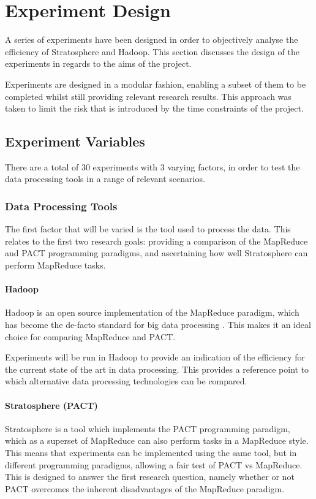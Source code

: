 \chapter{Experiment Design}
A series of experiments have been designed in order to objectively analyse the efficiency of Stratosphere and Hadoop. This section discusses the design of the experiments in regards to the aims of the project.

Experiments are designed in a modular fashion, enabling a subset of them to be completed whilst still providing relevant research results. This approach was taken to limit the risk that is introduced by the time constraints of the project. 

\section{Experiment Variables}
There are a total of 30 experiments with 3 varying factors, in order to test the data processing tools in a range of relevant scenarios. 

\subsection{Data Processing Tools}
The first factor that will be varied is the tool used to process the data. This relates to the first two research goals: providing a comparison of the MapReduce and PACT programming paradigms, and ascertaining how well Stratosphere can perform MapReduce tasks.

\subsubsection{Hadoop}
Hadoop is an open source implementation of the MapReduce paradigm, which has become the de-facto standard for big data processing \cite{qin2013reflection}. This makes it an ideal choice for comparing MapReduce and PACT.

Experiments will be run in Hadoop to provide an indication of the efficiency for the current state of the art in data processing. This provides a reference point to which alternative data processing technologies can be compared. 

\subsubsection{Stratosphere (PACT)}
Stratosphere is a tool which implements the PACT programming paradigm, which as a superset of MapReduce can also perform tasks in a MapReduce style. This means that experiments can be implemented using the same tool, but in different programming paradigms, allowing a fair test of PACT vs MapReduce. This is designed to answer the first research question, namely whether or not PACT overcomes the inherent disadvantages of the MapReduce paradigm.

